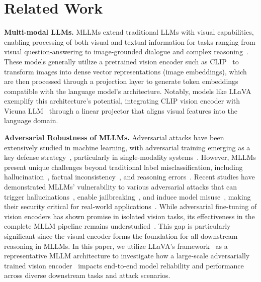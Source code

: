 \section{Related Work}
\textbf{Multi-modal LLMs.} MLLMs extend traditional LLMs with visual capabilities, enabling processing of both visual and textual information for tasks ranging from visual question-answering to image-grounded dialogue and complex reasoning~\cite{yin2023survey,li2024multimodal,caffagni2024r,awais2023foundational}. These models generally utilize a pretrained vision encoder such as CLIP~\cite{radford2021learning} to transform images into dense vector representations (image embeddings), which are then processed through a projection layer to generate token embeddings compatible with the language model's architecture. Notably, models like LLaVA~\cite{liu2024visual,liu2024improved} exemplify this architecture's potential, integrating CLIP vision encoder with Vicuna LLM~\cite{chiang2023vicuna} through a linear projector that aligns visual features into the language domain.

\noindent \textbf{Adversarial Robustness of MLLMs.}
Adversarial attacks have been extensively studied in machine learning, with adversarial training emerging as a key defense strategy~\cite{szegedy2013intriguing,goodfellow2014explaining,mkadry2017towards,zhang2019theoretically}, particularly in single-modality systems~\cite{carlini2017towards,ebrahimi2017hotflip}. However, MLLMs present unique challenges beyond traditional label misclassification, including hallucination~\cite{huang2024visual}, factual inconsistency~\cite{wang2023survey}, and reasoning errors~\cite{wang2024exploring}.
Recent studies have demonstrated MLLMs' vulnerability to various adversarial attacks that can trigger hallucinations~\cite{bai2024hallucination}, enable jailbreaking~\cite{jin2024jailbreakzoo}, and induce model misuse~\cite{niu2024jailbreaking}, making their security critical for real-world applications~\cite{liu2025mm,liu2024safety,zhang2024benchmarking}. While adversarial fine-tuning of vision encoders has shown promise in isolated vision tasks, its effectiveness in the complete MLLM pipeline remains understudied~\cite{mao2022understanding,schlarmann2024robust,hossain2024sim}. This gap is particularly significant since the visual encoder forms the foundation for all downstream reasoning in MLLMs. In this paper, we utilize LLaVA's framework~\cite{liu2024visual,liu2024improved} as a representative MLLM architecture to investigate how a large-scale adversarially trained vision encoder~\cite{wang2024revisiting} impacts end-to-end model reliability and performance across diverse downstream tasks and attack scenarios.


